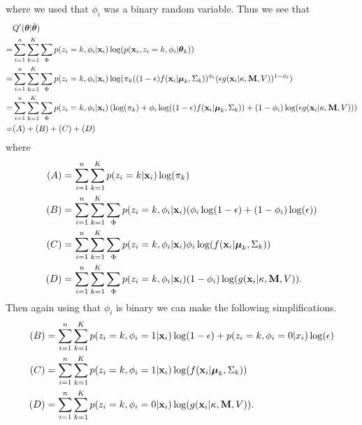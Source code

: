 \documentclass[12pt,english]{article}\usepackage[]{graphicx}\usepackage[]{color}
\begin{document}
where we used that $\phi_i$ was a binary random variable. Thus we see that
\begin{equation}
\begin{split}
&Q'(\boldsymbol{\theta}| \hat{\boldsymbol{\theta}}) \\
 = & \sum_{i=1}^{n} \sum_{k=1}^{K}\sum_{\Phi}p(z_i = k, \phi_i|{\bf x}_i) \log(p({\bf x}_i, z_i = k , \phi_i|\boldsymbol{\theta}_k)) \\
= & \sum_{i=1}^{n} \sum_{k=1}^{K}\sum_{\Phi}p(z_i = k, \phi_i|{\bf x}_i) \log(\pi_k ((1 - \epsilon)f({\bf x}_i|\boldsymbol{\mu}_k, \Sigma_k))^{\phi_i}(\epsilon g({\bf x}_i|\kappa, {\bf M}, V))^{1-\phi_i})  \\
= & \sum_{i=1}^{n} \sum_{k=1}^{K}\sum_{\Phi}p(z_i = k, \phi_i|{\bf x}_i)\left( \log(\pi_k)  + \phi_i\log((1 - \epsilon)f({\bf x}_i|\boldsymbol{\mu}_k, \Sigma_k)) + (1-\phi_i)\log(\epsilon g({\bf x}_i|\kappa, {\bf M}, V))\right)  \\
= & (A) + (B) + (C) + (D)
\end{split}
\end{equation}
where
\begin{equation}
\begin{split}
(A) &= \sum_{i=1}^{n} \sum_{k=1}^{K}p(z_i = k|{\bf x}_i)\log(\pi_k) \\
(B) & = \sum_{i=1}^{n} \sum_{k=1}^{K}\sum_{\Phi}p(z_i = k, \phi_i|{\bf x}_i)(\phi_i\log(1 - \epsilon) + (1-\phi_i)\log(\epsilon))\\
(C) & = \sum_{i=1}^{n} \sum_{k=1}^{K}\sum_{\Phi}p(z_i = k, \phi_i|{\bf x}_i)\phi_i \log (f({\bf x}_i|\boldsymbol{\mu}_k, \Sigma_k))\\
(D)& = \sum_{i=1}^{n} \sum_{k=1}^{K}\sum_{\Phi}p(z_i = k, \phi_i|{\bf x}_i)(1-\phi_i)\log( g({\bf x}_i|\kappa, {\bf M}, V)).\\
\end{split}
\end{equation}
Then again using that $\phi_i$ is binary we can make the following simplifications.
\begin{equation}\label{equation::q}
\begin{split}
(B) & = \sum_{i=1}^{n} \sum_{k=1}^{K}p(z_i = k, \phi_i = 1|{\bf x}_i)\log(1 - \epsilon) + p(z_i = k, \phi_i = 0|x_i)\log(\epsilon)\\
(C) & = \sum_{i=1}^{n} \sum_{k=1}^{K}p(z_i = k, \phi_i = 1|{\bf x}_i)\log (f({\bf x}_i|\boldsymbol{\mu}_k, \Sigma_k))\\
(D)& = \sum_{i=1}^{n} \sum_{k=1}^{K}p(z_i = k, \phi_i = 0 |{\bf x}_i)\log( g({\bf x}_i|\kappa, {\bf M}, V)).\\
\end{split}
\end{equation}
\end{document}
